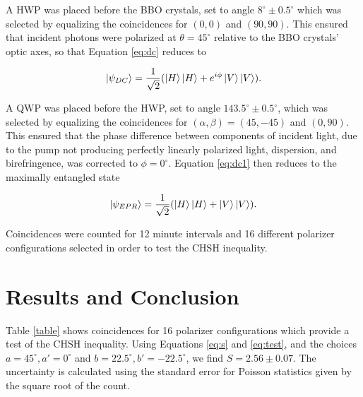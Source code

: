 \documentclass{article}
\let\Oldsection\section
\renewcommand{\section}{\FloatBarrier\Oldsection}
\begin{document}
A HWP was placed before the BBO crystals, set to angle $8^\circ\pm0.5^\circ$ which was selected by equalizing the coincidences for $(0, 0)$ and $(90, 90)$. This ensured that incident photons were polarized at $\theta = 45^{\circ}$ relative to the BBO crystals' optic axes, so that Equation \ref{eq:dc} reduces to

\begin{equation}
  \ket{\psi_{DC}} = \frac{1}{\sqrt{2}}(\ket{H} \ket{H} + e^{i\phi} \ket{V} \ket{V}).\label{eq:dc1}
\end{equation}

A QWP was placed before the HWP, set to angle $143.5^\circ\pm0.5^\circ$, which was selected by equalizing the coincidences for $(\alpha, \beta) = (45, -45)$ and $(0, 90)$. This ensured that the phase difference between components of incident light, due to the pump not producing perfectly linearly polarized light, dispersion, and birefringence, was corrected to $\phi = 0^\circ$. Equation \ref{eq:dc1} then reduces to the maximally entangled state

\begin{equation}
  \ket{\psi_{EPR}} = \frac{1}{\sqrt{2}}(\ket{H} \ket{H} + \ket{V} \ket{V}).\label{eq:dc2}
\end{equation}

Coincidences were counted for 12 minute intervals and 16 different polarizer configurations selected in order to test the CHSH inequality.

\section{Results and Conclusion}

Table \ref{table} shows coincidences for 16 polarizer configurations which provide a test of the CHSH inequality. Using Equations \ref{eq:s} and \ref{eq:test}, and the choices $a = 45^\circ, a' = 0^\circ$ and $b = 22.5^\circ, b' = -22.5^\circ$, we find $S = 2.56 \pm 0.07$. The uncertainty is calculated using the standard error for Poisson statistics given by the square root of the count.
\end{document}
